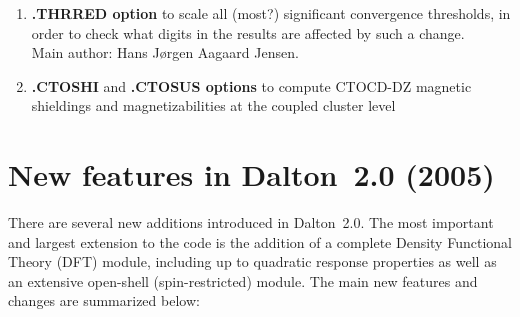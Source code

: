 \begin{enumerate}
\item{\bf .THRRED option} to scale all (most?) significant
convergence thresholds, in order to check what digits in the results are
affected by such a change.\\
Main author: Hans J\o rgen Aagaard Jensen.

\item{\bf .CTOSHI} and {\bf .CTOSUS options} to compute CTOCD-DZ magnetic
shieldings and magnetizabilities at the coupled cluster level

\end{enumerate}

\section{New features in Dalton~2.0 (2005)}

There are several new additions introduced in Dalton~2.0. The most
important and largest extension to the code is the addition of a
complete Density Functional Theory (DFT) module, including up to quadratic
response properties as well as an extensive open-shell
(spin-restricted) module. The main new features and changes are
summarized below:

